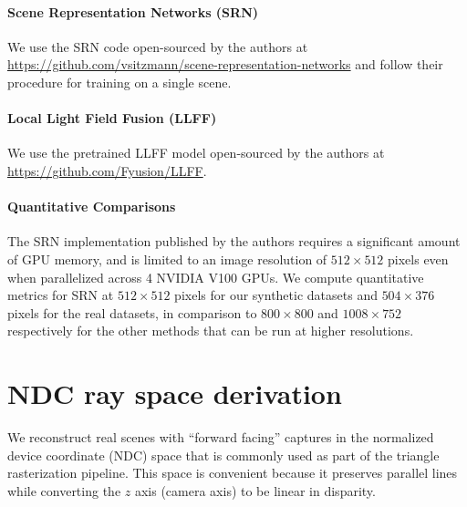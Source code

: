 \documentclass[runningheads]{llncs}
\begin{document}
\paragraph{\textbf{Scene Representation Networks (SRN)}~\cite{srn}}
We use the SRN code open-sourced by the authors at \url{https://github.com/vsitzmann/scene-representation-networks} and follow their procedure for training on a single scene.

\paragraph{\textbf{Local Light Field Fusion (LLFF)}~\cite{mildenhall19}}
We use the pretrained LLFF model open-sourced by the authors at \url{https://github.com/Fyusion/LLFF}.

\paragraph{\textbf{Quantitative Comparisons}} The SRN implementation published by the authors requires a significant amount of GPU memory, and is limited to an image resolution of $512 \times 512$ pixels even when parallelized across 4 NVIDIA V100 GPUs. We compute quantitative metrics for SRN at $512 \times 512$ pixels for our synthetic datasets and $504 \times 376$ pixels for the real datasets, in comparison to $800\times 800$ and $1008 \times 752$ respectively for the other methods that can be run at higher resolutions.


\section{NDC ray space derivation}

We reconstruct real scenes with ``forward facing'' captures in the normalized device coordinate (NDC) space that is commonly used as part of the triangle rasterization pipeline. This space is convenient because it preserves parallel lines while converting the $z$ axis (camera axis) to be linear in disparity.
\end{document}
